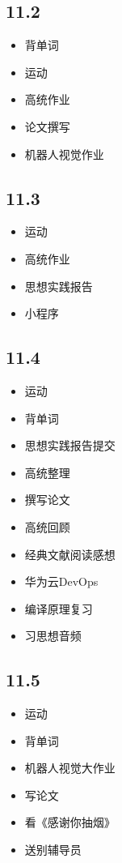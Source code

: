 \documentclass[UTF8]{ctexart}
\begin{document}
\subsection*{11.2}
\begin{itemize}
    \item 背单词
    \item 运动
    \item 高统作业
    \item 论文撰写
    \item 机器人视觉作业
\end{itemize}

\subsection*{11.3}
\begin{itemize}
    \item 运动
    \item 高统作业
    \item 思想实践报告
    \item 小程序
\end{itemize}

\subsection*{11.4}
\begin{itemize}
    \item 运动
    \item 背单词
    \item 思想实践报告提交
    \item 高统整理
    \item 撰写论文
    \item 高统回顾
    \item 经典文献阅读感想
    \item 华为云DevOps
    \item 编译原理复习
    \item 习思想音频
\end{itemize}

\subsection*{11.5}
\begin{itemize}
    \item 运动
    \item 背单词
    \item 机器人视觉大作业
    \item 写论文
    \item 看《感谢你抽烟》
    \item 送别辅导员
\end{itemize}
\end{document}
